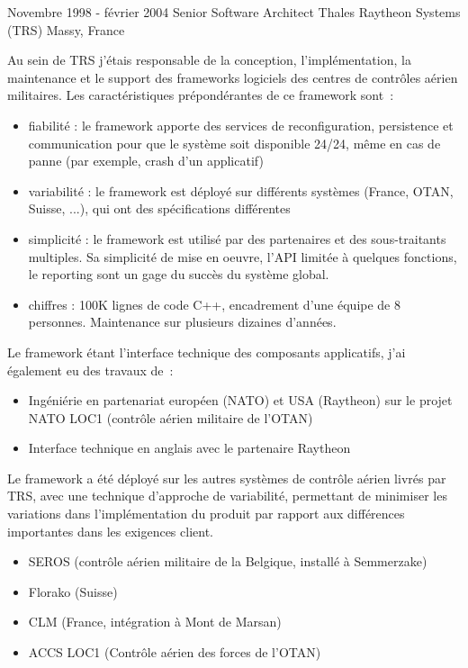 \item{
\cventrylc
{Novembre 1998 - février 2004} %
{Senior Software Architect} %
{Thales Raytheon Systems (TRS)} %
{Massy, France} %
{}
{ %
Au sein de TRS j'étais responsable de la conception, l'implémentation, la maintenance et le support des frameworks logiciels des centres de contrôles aérien militaires. Les caractéristiques prépondérantes de ce framework sont~:
\begin{itemize}
\item{fiabilité : le framework apporte des services de reconfiguration, persistence et communication pour que le système soit disponible 24/24, même en cas de panne (par exemple, crash d'un applicatif) }
\item{variabilité : le framework est déployé sur différents systèmes (France, OTAN, Suisse, ...), qui ont des spécifications différentes}
\item{simplicité : le framework est utilisé par des partenaires et des sous-traitants multiples. Sa simplicité de mise en oeuvre, l'API limitée à quelques fonctions, le reporting sont un gage du succès du système global.}
\item{chiffres : 100K lignes de code C++, encadrement d'une équipe de 8 personnes. Maintenance sur plusieurs dizaines d'années.}
\end{itemize}
\myvspace
Le framework étant l'interface technique des composants applicatifs, j'ai également eu des travaux de~:
\begin{itemize}
\item {Ingéniérie en partenariat européen (NATO) et USA (Raytheon) sur le projet NATO LOC1 (contrôle aérien militaire de l'OTAN)}
\item {Interface technique en anglais avec le partenaire Raytheon}
\end{itemize}
\myvspace
Le framework a été déployé sur les autres systèmes de contrôle aérien livrés par TRS, avec une technique d'approche de variabilité, permettant de minimiser les variations dans l'implémentation du produit par rapport aux différences importantes dans les exigences client.
 \begin{itemize}
 \item SEROS (contrôle aérien militaire de la Belgique, installé à Semmerzake)
 \item Florako (Suisse)
 \item CLM (France, intégration à Mont de Marsan)
 \item ACCS LOC1 (Contrôle aérien des forces de l'OTAN)
 \end{itemize}
}
\vspace{3pt}
}